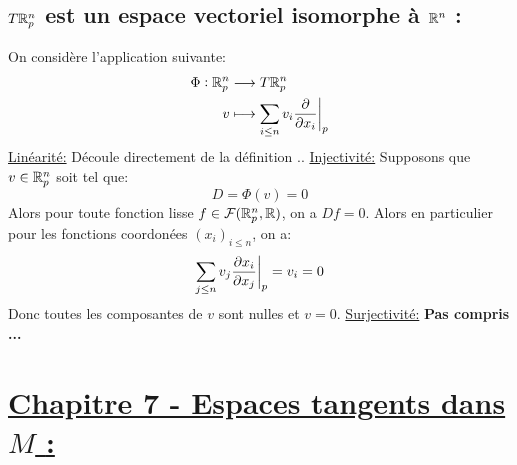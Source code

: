    \subsection*{\( T\mathbb{R}^n_p \) est un espace vectoriel isomorphe à \( \mathbb{R}^n \) {:}}
   On considère l'application suivante:
   \[ 
      \begin{aligned}
         \Phi : \mathbb{R}^n_p &\longrightarrow T\mathbb{R}^n_p \\
         v &\longmapsto \sum_{i \leq n} v_i \frac{\partial }{\partial x_i}\biggr|_p
      \end{aligned} 
   \]
   \uline{Linéarité:} Découle directement de la définition ..\+
   \uline{Injectivité:} Supposons que \( v \in \mathbb{R}^n_p \) soit tel que:
   \[ 
      D = \Phi(v) = 0
   \]
   Alors pour toute fonction lisse \( f \in \mathcal{F}(\mathbb{R}^n_p, \mathbb{R}) \), on a \( Df = 0 \). Alors en particulier pour les fonctions coordonées \( (x_i)_{i \leq n} \), on a:
   \[ 
      \sum_{j \leq n}v_j \frac{\partial x_i}{\partial x_j}\biggr|_p = v_i = 0
   \]
   Donc toutes les composantes de \( v \) sont nulles et \( v = 0 \).\+
   \uline{Surjectivité:}
   {\textbf{\color{red} Pas compris ...}}
\pagebreak
\section*{\uline{Chapitre 7 - Espaces tangents dans \( M \) {:}}}
